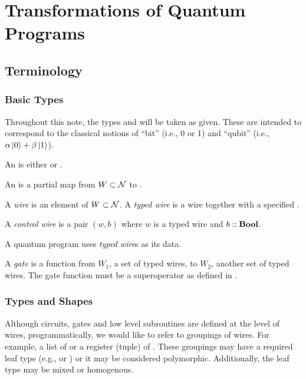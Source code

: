 \chapter{Transformations of Quantum Programs}\label{chap:transformations_of_quantum_programs}


\section{Terminology} %
\label{sec:terminology}
\subsection{Basic Types} %
\label{sub:basic_types}
Throughout this note, the types \bit and \qubit will be
taken as given. These are intended to correspond to the
classical notions of ``bit'' (i.e., 0 or 1) and ``qubit''
(i.e., $\alpha\left\vert{0}\right\rangle + \beta\left\vert{1}\right\rangle$).
\begin{definition}\label{def:endpoint}
  An  is either \bit or \qubit.
\end{definition}

\begin{definition}\label{def:arity}
  An  is a partial map from $W\subset\mathcal{N}$ to .
\end{definition}

\begin{definition}\label{def:wire}
  A \emph{wire} is an element of $W\subset\mathcal{N}$. A \emph{typed wire} is a wire
  together with a specified .
\end{definition}

\begin{definition}\label{def:control}
  A \emph{control wire} is a pair $(w,b)$ where $w$ is a
  typed wire and $b::\mathbf{{Bool}}$.
\end{definition}

A quantum program uses \emph{typed wire}s as its data.

\begin{definition}\label{def:gate}
  A \emph{gate} is a function from $W_1$, a set of typed wires, to $W_2$,
  another
  set of typed wires. The gate function must be a superoperator
  as defined in \cite{selinger04:qpl}.
\end{definition}

\subsection{Types and Shapes} %
\label{sub:types_and_shapes}
Although circuits, gates and low level subroutines are defined at
the level of wires, programmatically, we would like
to refer to groupings of wires. For example, a list of \qubit
or a register (tuple) of \qubit. These groupings may have a
required leaf type (e.g., \qubit or \bit) or it may be
considered polymorphic. Additionally, the leaf type may be mixed
or homogenous.

